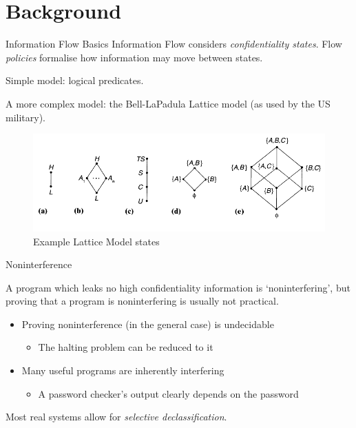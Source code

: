 \section{Background}

\begin{frame}{Information Flow Basics}
	Information Flow considers \textit{confidentiality states}. Flow \textit{policies} formalise how information may move between states.
	
	Simple model: logical predicates.
	
	A more complex model: the Bell-LaPadula Lattice model (as used by the US military).
	
	\begin{figure}
		\includegraphics[scale=0.45]{content/images/lattice_examples.png}
		\caption{Example Lattice Model states \cite{ifbackground:sandhu}}
	\end{figure}
	
\end{frame}

\begin{frame}{Noninterference}
	
	A program which leaks no high confidentiality information is `noninterfering', but proving that a program is noninterfering is usually not practical.
	
	
	\begin{itemize}
		\item Proving noninterference (in the general case) is undecidable
			\begin{itemize}
				\item The halting problem can be reduced to it
			\end{itemize}
		\item Many useful programs are inherently interfering
			\begin{itemize}
				\item A password checker's output clearly depends on the password
			\end{itemize}
	\end{itemize}
	
	Most real systems allow for \textit{selective declassification}.
\end{frame}


